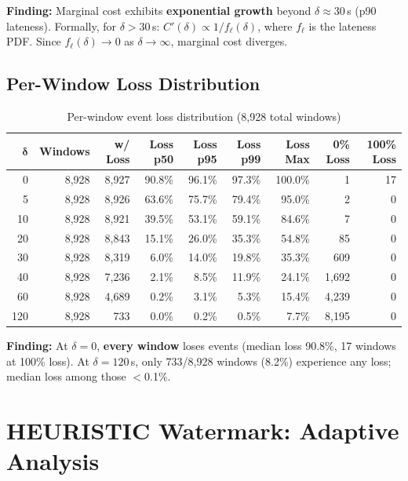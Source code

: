 \documentclass[11pt,a4paper]{article}
\begin{document}
\textbf{Finding:} Marginal cost exhibits \textbf{exponential growth} beyond $\delta \approx 30$\,s (p90 lateness).
Formally, for $\delta > 30$\,s: $C'(\delta) \propto 1/f_\ell(\delta)$, where $f_\ell$ is the lateness PDF.
Since $f_\ell(\delta) \to 0$ as $\delta \to \infty$, marginal cost diverges.

\subsection{Per-Window Loss Distribution}

\begin{table}[H]
\centering
\caption{Per-window event loss distribution (8,928 total windows)}
\label{tab:window-loss}
\footnotesize
\begin{tabular}{rrrrrrrrr}
\toprule
$\bm{\delta}$ & \textbf{Windows} & \textbf{w/ Loss} & \textbf{Loss p50} & \textbf{Loss p95} & \textbf{Loss p99} & \textbf{Loss Max} & \textbf{0\% Loss} & \textbf{100\% Loss} \\
\midrule
0   & 8,928 & 8,927 & 90.8\% & 96.1\% & 97.3\% & 100.0\% & 1    & 17 \\
5   & 8,928 & 8,926 & 63.6\% & 75.7\% & 79.4\% & 95.0\%  & 2    & 0 \\
10  & 8,928 & 8,921 & 39.5\% & 53.1\% & 59.1\% & 84.6\%  & 7    & 0 \\
20  & 8,928 & 8,843 & 15.1\% & 26.0\% & 35.3\% & 54.8\%  & 85   & 0 \\
30  & 8,928 & 8,319 & 6.0\%  & 14.0\% & 19.8\% & 35.3\%  & 609  & 0 \\
40  & 8,928 & 7,236 & 2.1\%  & 8.5\%  & 11.9\% & 24.1\%  & 1,692 & 0 \\
60  & 8,928 & 4,689 & 0.2\%  & 3.1\%  & 5.3\%  & 15.4\%  & 4,239 & 0 \\
120 & 8,928 & 733   & 0.0\%  & 0.2\%  & 0.5\%  & 7.7\%   & 8,195 & 0 \\
\bottomrule
\end{tabular}
\end{table}

\textbf{Finding:} At $\delta = 0$, \textbf{every window} loses events (median loss 90.8\%, 17 windows at 100\% loss).
At $\delta = 120$\,s, only 733/8,928 windows (8.2\%) experience any loss; median loss among those $<$0.1\%.

\section{HEURISTIC Watermark: Adaptive Analysis}
\end{document}
